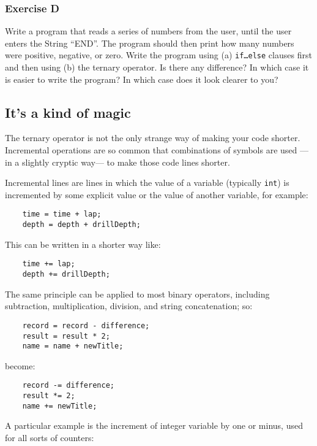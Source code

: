 \subsubsection*{Exercise D}

Write a program that reads a series of numbers from the user, until the
user enters the String ``END''. The program
should then print how many numbers were positive, negative, or
zero. Write the program using (a) \texttt{if\ldots else} clauses first 
and then using (b) the ternary operator. 
Is there any difference? In which case it is
easier to write the program? In which case does it look clearer to you?

\subsection{It's a kind of magic}
\label{sec:its-kind-magic}

The ternary operator is not the only strange way of making your code
shorter. Incremental operations are so common that combinations of
symbols are used ---in a slightly cryptic way--- to make those code
lines shorter.

Incremental lines are lines in which the value of a variable
(typically \verb+int+) is incremented by some explicit value or the
value of another variable, for example: 

\begin{verbatim}
    time = time + lap;
    depth = depth + drillDepth;
\end{verbatim}

This can be written in a shorter way like: 

\begin{verbatim}
    time += lap;
    depth += drillDepth;
\end{verbatim}

The same principle can be applied to most binary operators, including
subtraction, multiplication, division, and string concatenation; so: 

\begin{verbatim}
    record = record - difference; 
    result = result * 2;
    name = name + newTitle;
\end{verbatim}

become: 

\begin{verbatim}
    record -= difference; 
    result *= 2;
    name += newTitle;
\end{verbatim}

A particular example is the increment of integer variable by one or
minus, used for all sorts of counters:

